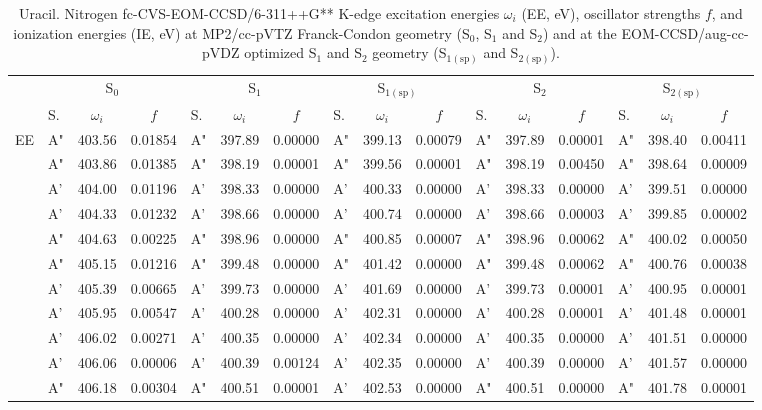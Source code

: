 \documentclass[journal=jctcce,manuscript=article]{achemso}
\begin{document}
\begin{table}
\caption{Uracil.  Nitrogen fc-CVS-EOM-CCSD/6-311++G** K-edge excitation energies $\omega_i$ (EE, eV), oscillator strengths $f$, and ionization energies (IE, eV) at MP2/cc-pVTZ Franck-Condon geometry (S$_0$, S$_1$ and S$_2$) and at the EOM-CCSD/aug-cc-pVDZ optimized S$_1$ and S$_2$ geometry (S$_{1(\text{sp})}$ and S$_{2(\text{sp})}$).
\label{Tab:Uracil:CCSD:Nitrogen}}
\scriptsize
\begin{tabular}{l|lcc|lcc|lcc|lcc|lcc}
\cline{2-16}
& \multicolumn{3}{c|}{S$_0$}
& \multicolumn{3}{c|}{S$_1$}  
& \multicolumn{3}{c|}{S$_{1(\text{sp})}$}
& \multicolumn{3}{c|}{S$_2$}
& \multicolumn{3}{c}{S$_{2(\text{sp})}$}
\\
\cline{2-16}
& S. & $\omega_i$ & $f$ 
& S. & $\omega_i$ & $f$ 
& S. & $\omega_i$ & $f$ 
& S. & $\omega_i$ & $f$ 
& S. & $\omega_i$ & $f$\\
\hline
  EE 
& A" & 403.56 & 0.01854 & A" & 397.89 & 0.00000 & A" & 399.13 & 0.00079 & A" & 397.89 & 0.00001 & A" & 398.40 & 0.00411 \\
& A" & 403.86 & 0.01385 & A" & 398.19 & 0.00001 & A" & 399.56 & 0.00001 & A" & 398.19 & 0.00450 & A" & 398.64 & 0.00009 \\
& A' & 404.00 & 0.01196 & A' & 398.33 & 0.00000 & A' & 400.33 & 0.00000 & A' & 398.33 & 0.00000 & A' & 399.51 & 0.00000 \\
& A' & 404.33 & 0.01232 & A' & 398.66 & 0.00000 & A' & 400.74 & 0.00000 & A' & 398.66 & 0.00003 & A' & 399.85 & 0.00002 \\
& A" & 404.63 & 0.00225 & A" & 398.96 & 0.00000 & A" & 400.85 & 0.00007 & A" & 398.96 & 0.00062 & A" & 400.02 & 0.00050 \\
& A" & 405.15 & 0.01216 & A" & 399.48 & 0.00000 & A" & 401.42 & 0.00000 & A" & 399.48 & 0.00062 & A" & 400.76 & 0.00038 \\
& A' & 405.39 & 0.00665 & A' & 399.73 & 0.00000 & A' & 401.69 & 0.00000 & A' & 399.73 & 0.00001 & A' & 400.95 & 0.00001 \\
& A' & 405.95 & 0.00547 & A' & 400.28 & 0.00000 & A' & 402.31 & 0.00000 & A' & 400.28 & 0.00001 & A' & 401.48 & 0.00001 \\
& A' & 406.02 & 0.00271 & A' & 400.35 & 0.00000 & A' & 402.34 & 0.00000 & A' & 400.35 & 0.00000 & A' & 401.51 & 0.00000 \\
& A' & 406.06 & 0.00006 & A' & 400.39 & 0.00124 & A' & 402.35 & 0.00000 & A' & 400.39 & 0.00000 & A' & 401.57 & 0.00000 \\
& A" & 406.18 & 0.00304 & A" & 400.51 & 0.00001 & A' & 402.53 & 0.00000 & A" & 400.51 & 0.00000 & A" & 401.78 & 0.00001 \\

\end{tabular}
\end{table}
\end{document}
